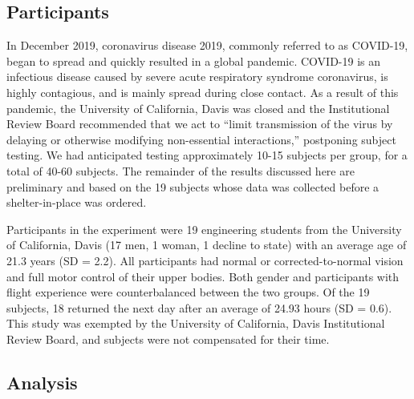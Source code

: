 \subsection{Participants}
In December 2019, coronavirus disease 2019, commonly referred to as COVID-19, began to spread and quickly resulted in a global pandemic.
COVID-19 is an infectious disease caused by severe acute respiratory syndrome coronavirus, is highly contagious, and is mainly spread during close contact.
As a result of this pandemic, the University of California, Davis was closed and the Institutional Review Board recommended that we act to ``limit transmission of the virus by delaying or otherwise modifying non-essential interactions,'' postponing subject testing.
We had anticipated testing approximately 10-15 subjects per group, for a total of 40-60 subjects.
The remainder of the results discussed here are preliminary and based on the 19 subjects whose data was collected before a shelter-in-place was ordered.

Participants in the experiment were 19 engineering students from the University of California, Davis (17 men, 1 woman, 1 decline to state) with an average age of 21.3 years (SD = 2.2).
All participants had normal or corrected-to-normal vision and full motor control of their upper bodies.
Both gender and participants with flight experience were counterbalanced between the two groups.
Of the 19 subjects, 18 returned the next day after an average of 24.93 hours (SD = 0.6).
This study was exempted by the University of California, Davis Institutional Review Board, and subjects were not compensated for their time.

\subsection{Analysis}

